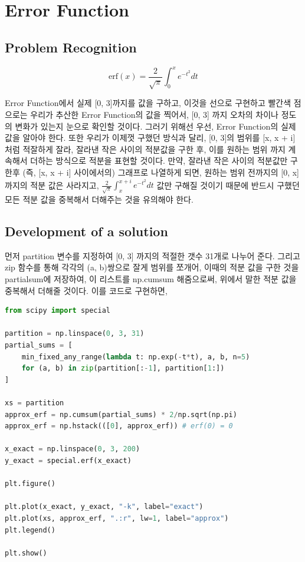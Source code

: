 \documentclass[11pt]{article}
\begin{document}
\section{Error Function}
\subsection{Problem Recognition} 
\begin{equation}
\mathrm{erf}(x) = \frac{2}{\sqrt\pi} \int_0^x e^{-t^2} dt
\end{equation}

Error Function에서 실제 [0, 3]까지를 값을 구하고, 이것을 선으로 구현하고 빨간색 점으로는 우리가 추산한 Error Function의 값을 찍어서, [0, 3] 까지 오차의 차이나 정도의 변화가 있는지 눈으로 확인할 것이다. 그러기 위해선 우선, Error Function의 실제 값을 알아야 한다. 또한 우리가 이제껏 구했던 방식과 달리, [0, 3]의 범위를 [x, x + i] 처럼 적잘하게 잘라, 잘라낸 작은 사이의 적분값을 구한 후, 이를 원하는 범위 까지 계속해서 더하는 방식으로 적분을 표현할 것이다. 만약, 잘라낸 작은 사이의 적분값만 구한후 (즉, [x, x + i] 사이에서의) 그래프로 나열하게 되면, 원하는 범위 전까지의 [0, x] 까지의 적분 값은 사라지고,  $\frac{2}{\sqrt\pi} \int_x^{x+i} e^{-t^2} dt $ 값만 구해질 것이기 때문에 반드시 구했던 모든 적분 값을 중복해서 더해주는 것을 유의해야 한다.


\subsection{Development of a solution} 
먼저 partition 변수를 지정하여 [0, 3] 까지의 적절한 갯수 31개로 나누어 준다. 그리고 zip 함수를 통해 각각의 (a, b)쌍으로 잘게 범위를 쪼개어, 이때의 적분 값을 구한 것을 partial\textunderscore sum에 저장하여, 이 리스트를 np.cumsum 해줌으로써, 위에서 말한 적분 값을 중복해서 더해줄 것이다. 이를 코드로 구현하면, 

\begin{lstlisting}[language=Python]
from scipy import special

partition = np.linspace(0, 3, 31)
partial_sums = [
    min_fixed_any_range(lambda t: np.exp(-t*t), a, b, n=5)
    for (a, b) in zip(partition[:-1], partition[1:])
]

xs = partition
approx_erf = np.cumsum(partial_sums) * 2/np.sqrt(np.pi)
approx_erf = np.hstack(([0], approx_erf)) # erf(0) = 0

x_exact = np.linspace(0, 3, 200)
y_exact = special.erf(x_exact)

plt.figure()

plt.plot(x_exact, y_exact, "-k", label="exact")
plt.plot(xs, approx_erf, ".:r", lw=1, label="approx")
plt.legend()

plt.show()
\end{lstlisting}
\end{document}

